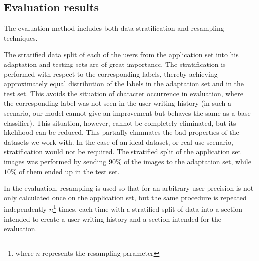 \documentclass{article}
\begin{document}
\subsection{Evaluation results}

The evaluation method includes both data stratification and resampling techniques.

The stratified data split of each of the users from the application set into his adaptation and testing sets are of great importance.
The stratification is performed with respect to the corresponding labels, thereby achieving approximately equal distribution of the labels in the adaptation set and in the test set.
This avoids the situation of character occurrence in evaluation, where the corresponding label was not seen in the user writing history
(in such a scenario, our model cannot give an improvement but behaves the same as a base classifier).
This situation, however, cannot be completely eliminated, but its likelihood can be reduced.
This partially eliminates the bad properties of the datasets we work with.
In the case of an ideal dataset, or real use scenario, stratification would not be required.
The stratified split of the application set images was performed by sending $90\%$ of the images to the adaptation set, while $10\%$ of them ended up in the test set.

In the evaluation, resampling is used so that for an arbitrary user precision is not only calculated once on the application set, but the same procedure is repeated
independently $n$\footnote{where $n$ represents the resampling parameter} times,
each time with a stratified split of data into a section intended to create a user writing history and a section intended for the evaluation.
\end{document}

